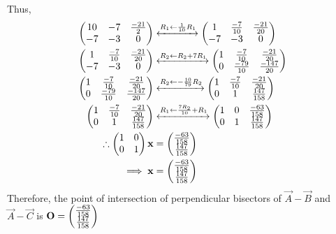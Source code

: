 \documentclass[11pt]{book}
\begin{document}
\begin{enumerate}[label=\thesection.\arabic*.,ref=\thesection.\theenumi]
Thus,
\begin{align}
\begin{pmatrix}10&-7&\frac{-21}{2}\\-7&-3&0\end{pmatrix} &\xleftrightarrow[]{R_1 \leftarrow \frac{1}{10} R_1} \begin{pmatrix}1&\frac{-7}{10}&\frac{-21}{20}\\-7&-3&0\end{pmatrix}\\
\begin{pmatrix}1&\frac{-7}{10}&\frac{-21}{20}\\-7&-3&0\end{pmatrix} &\xleftrightarrow[]{R_2\leftarrow R_2 + 7R_1}
\begin{pmatrix}1&\frac{-7}{10}& \frac{-21}{20}\\0&\frac{-79}{10}&\frac{-147}{20}\end{pmatrix}\\
\begin{pmatrix}1&\frac{-7}{10}&\frac{-21}{20}\\0&\frac{-79}{10}&\frac{-147}{20}\end{pmatrix} &\xleftrightarrow[]{R_2 \leftarrow -\frac{10}{79}R_2}
\begin{pmatrix}1&\frac{-7}{10}&\frac{-21}{20} \\0&1&\frac{147}{158}\end{pmatrix}\\
\begin{pmatrix}1&\frac{-7}{10}&\frac{-21}{20} \\0&1&\frac{147}{158}\end{pmatrix} &\xleftrightarrow[]{R_1\leftarrow \frac{7R_2}{10}+R_1}\begin{pmatrix}1&0&\frac{-63}{158} \\0&1&\frac{147}{158}\end{pmatrix}\\
\therefore \begin{pmatrix}1&0\\0&1\end{pmatrix}\mathbf{x} &= \begin{pmatrix}\frac{-63}{158}\\\frac{147}{158}\end{pmatrix}\\
\implies \mathbf{x}&=\begin{pmatrix}\frac{-63}{158}\\\frac{147}{158}\end{pmatrix}
\end{align}
Therefore, the point of intersection of perpendicular bisectors of $\vec{A}-\vec{B}$ and $\vec{A}-\vec{C}$ is $\mathbf{O} = \begin{pmatrix}\frac{-63}{158}\\ \frac{147}{158}\end{pmatrix}$


\end{enumerate}
\end{document}
